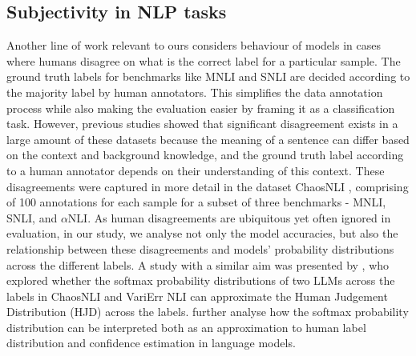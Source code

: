 \subsection{Subjectivity in NLP tasks}
\label{related:subjectivity}
Another line of work relevant to ours considers behaviour of models in cases where humans disagree on what is the correct label for a particular sample. 
The ground truth labels for benchmarks like MNLI and SNLI are decided according to the majority label by human annotators. 
This simplifies the data annotation process while also making the evaluation easier by framing it as a classification task. 
However, previous studies \citep{pavlick-kwiatkowski-2019-inherent, nie-etal-2020-learn} showed that significant disagreement exists in a large amount of these datasets because the meaning of a sentence can differ based on the context and background knowledge, and the ground truth label according to a human annotator depends on their understanding of this context. 
These disagreements were captured in more detail in the dataset ChaosNLI \citet{nie-etal-2020-learn}, comprising of 100 annotations for each sample for a subset of three benchmarks - MNLI, SNLI, and $\alpha$NLI.
As human disagreements are ubiquitous yet often ignored in evaluation, in our study, we analyse not only the model accuracies, but also the relationship between these disagreements and models' probability distributions across the different labels.
A study with a similar aim was presented by \citet{chen2024seeingbig}, who explored whether the softmax probability distributions of two LLMs across the labels in ChaosNLI and VariErr NLI \citep{weber-genzel-etal-2024-varierr} can approximate the Human Judgement Distribution (HJD) across the labels. 
\citet{baan-etal-2024-interpreting} further analyse how the softmax probability distribution can be interpreted both as an approximation to human label distribution and confidence estimation in language models.
